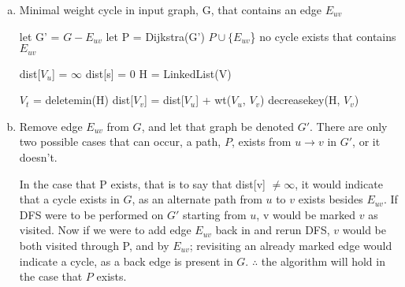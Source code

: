 \documentclass[10pt]{article}
\begin{document}

\begin{question}
    \begin{enumerate}[a)]
        \item %
        \begin{algorithm}[H]
            \caption{Minimal weight cycle in input graph, G, that contains an edge $E_{uv}$}
            \begin{algorithmic}[1]
                   \State let G' = $G - E_{uv}$ 
                   \State let P = Dijkstra(G') 
                        \State {} $P \cup \{E_{uv}$\}
                   \Else
                        \State {} no cycle exists that contains $E_{uv}$
                   \EndIf
                \EndProcedure{}
                
                        \State dist[$V_u$] = $\infty$
                    \EndFor
                    \State dist[s] = 0
                    \State H = LinkedList(V)
                    
                        \State $V_t$ = deletemin(H)
                                \State dist[$V_v$] = dist[$V_u$] + wt($V_u$, $V_v$)
                                \State decreasekey(H, $V_v$)
                            \EndIf
                        \EndFor
                    \EndWhile
                \EndProcedure{}
            \end{algorithmic}
        \end{algorithm}
        \item %
            Remove edge $E_{uv}$ from $G$, and let that graph be denoted $G'$. There are only two possible cases that can occur, a path, $P$, exists from $u \rightarrow v$ in $G'$, or it doesn't. 
            
            In the case that P exists, that is to say that dist[v] $\neq \infty$, it would indicate that a cycle exists in $G$, as an alternate path from $u$ to $v$ exists besides $E_{uv}$. If DFS were to be performed on $G'$ starting from $u$, v would be marked $v$ as visited. Now if we were to add edge $E_{uv}$ back in and rerun DFS, $v$ would be both visited through P, and by $E_{uv}$; revisiting an already marked edge would indicate a cycle, as a back edge is present in $G$. $\therefore$ the algorithm will hold in the case that $P$ exists.
            

\end{enumerate}
\end{question}
\end{document}
